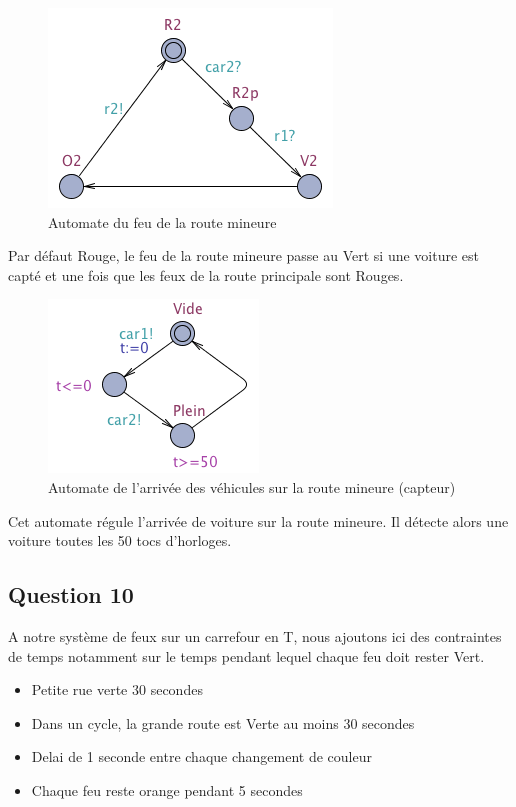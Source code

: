 \documentclass[11pt]{article}
\begin{document}
\begin{figure}[H]
	\centering
	\includegraphics{ressources/part3/Q9-2.png}
	\caption{Automate du feu de la route mineure}
\end{figure}

Par défaut Rouge, le feu de la route mineure passe au Vert si une voiture est capté et une fois que les feux de la route principale sont Rouges.

\begin{figure}[H]
	\centering
	\includegraphics{ressources/part3/Q9-3.png}
	\caption{Automate de l'arrivée des véhicules sur la route mineure (capteur)}
\end{figure}

Cet automate régule l'arrivée de voiture sur la route mineure. Il détecte alors une voiture toutes les 50 tocs d'horloges.

\subsection{Question 10}\label{question-10}

A notre système de feux sur un carrefour en T, nous ajoutons ici des contraintes de temps notamment sur le temps pendant lequel chaque feu doit rester Vert.

\begin{itemize}
	\item Petite rue verte 30 secondes
	\item Dans un cycle, la grande route est Verte au moins 30 secondes
	\item Delai de 1 seconde entre chaque changement de couleur
	\item Chaque feu reste orange pendant 5 secondes
\end{itemize}
\end{document}
